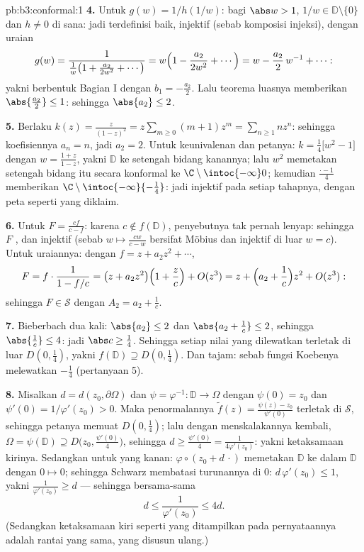 \begin{solution}{pb:b3:conformal:1}
\textbf{4.} Untuk $g(w) = 1/h(1/w)$: bagi $\abs w > 1$, $1/w \in
\mathbb D\setminus\{0\}$ dan $h \neq 0$ di sana: jadi terdefinisi baik,
injektif (sebab komposisi injeksi), dengan uraian
\[
g(w) = \frac{1}{\frac1w\bigl(1 + \frac{a_2}{2w^2} +
\cdots\bigr)} = w\Bigl(1 - \frac{a_2}{2w^2} + \cdots\Bigr)
= w - \frac{a_2}{2}\,w^{-1} + \cdots :
\]
yakni berbentuk Bagian I dengan $b_1 = -\frac{a_2}2$. Lalu teorema luasnya
memberikan $\abs{\frac{a_2}2} \leq 1$: sehingga $\abs{a_2} \leq 2$.

\textbf{5.} Berlaku $k(z) = \frac z{(1-z)^2} = z\sum_{m\geq0}(m +
1)z^m = \sum_{n\geq1}nz^n$: sehingga koefisiennya $a_n = n$, jadi $a_2 =
2$. Untuk keunivalenan dan petanya: $k = \frac14\bigl[w^2 - 1\bigr]$
dengan $w = \frac{1 + z}{1 - z}$, yakni  $\mathbb D$
ke setengah bidang kanannya; lalu $w^2$ memetakan setengah bidang itu
secara konformal ke $\C\setminus\intoc{-\infty}0$; kemudian
$\frac{\cdot - 1}4$ memberikan
$\C\setminus\intoc{-\infty}{-\frac14}$: jadi injektif pada setiap
tahapnya, dengan peta seperti yang diklaim.

\textbf{6.} Untuk $F = \frac{cf}{c - f}$: karena $c \notin f(\mathbb
D)$, penyebutnya tak pernah lenyap: sehingga $F$ , dan
injektif (sebab $w \mapsto \frac{cw}{c - w}$ bersifat Möbius dan injektif
di luar $w = c$). Untuk uraiannya: dengan $f = z + a_2z^2 + \cdots$,
\[
F = f\cdot\frac1{1 - f/c} = \bigl(z + a_2z^2\bigr)\Bigl(1 +
\frac zc\Bigr) + O(z^3)
= z + \Bigl(a_2 + \frac1c\Bigr)z^2 + O(z^3):
\]
sehingga $F \in \mathcal S$ dengan $A_2 = a_2 + \frac1c$.

\textbf{7.} Bieberbach dua kali: $\abs{a_2} \leq 2$ dan
$\abs{a_2 + \frac1c} \leq 2$, sehingga $\abs{\frac1c} \leq 4$:
jadi $\abs c \geq \frac14$. Sehingga setiap nilai yang dilewatkan terletak di luar
$D(0,\frac14)$, yakni $f(\mathbb D) \supseteq D(0, \frac14)$.
Dan tajam: sebab fungsi Koebenya melewatkan $-\frac14$ (pertanyaan 5).

\textbf{8.} Misalkan $d = d(z_0, \partial\Omega)$ dan $\psi =
\varphi^{-1} \colon \mathbb D \to \Omega$ dengan $\psi(0) = z_0$ dan
$\psi'(0) = 1/\varphi'(z_0) > 0$. Maka penormalannya $\tilde
f(z) = \frac{\psi(z) - z_0}{\psi'(0)}$ terletak di $\mathcal S$,
sehingga petanya memuat $D(0, \frac14)$; lalu dengan menskalakannya kembali,
$\Omega = \psi(\mathbb D) \supseteq D\bigl(z_0,
\tfrac{\psi'(0)}4\bigr)$, sehingga $d \geq \frac{\psi'(0)}4 =
\frac1{4\varphi'(z_0)}$: yakni ketaksamaan kirinya. Sedangkan untuk yang kanan: $\varphi\circ(z_0 + d\,\cdot)$
memetakan $\mathbb D$ ke dalam $\mathbb D$ dengan $0 \mapsto 0$; sehingga Schwarz
membatasi turunannya di $0$: $d\,\varphi'(z_0) \leq 1$, yakni
$\frac1{\varphi'(z_0)} \geq d$ --- sehingga bersama-sama
\[
d \leq \frac1{\varphi'(z_0)} \leq 4d .
\]
(Sedangkan ketaksamaan kiri seperti yang ditampilkan pada pernyataannya adalah
rantai yang sama, yang disusun ulang.)


\end{solution}
